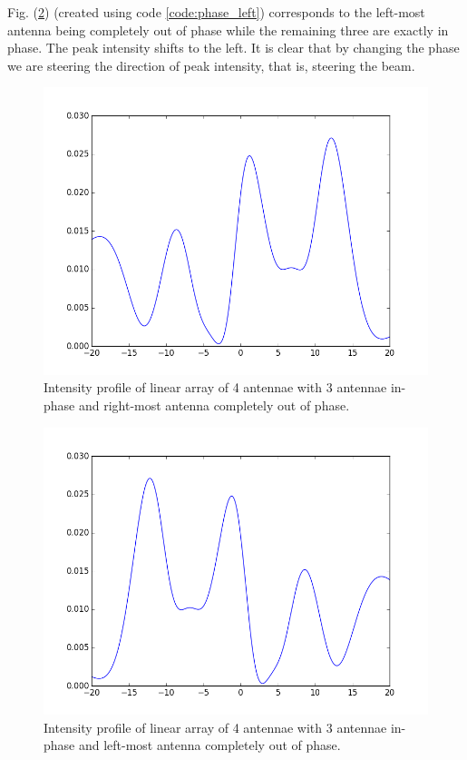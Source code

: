 Fig. (\ref{fig:phase_2}) (created using code \ref{code:phase_left}) corresponds to the left-most antenna being completely out of phase while the remaining three are exactly in phase. The peak intensity shifts to the left. It is clear that by changing the phase we are steering the direction of peak intensity, that is, steering the beam.

\begin{figure}[!h]
	\centering	
	\includegraphics[scale=0.45]{figure_3.png}
    \caption{\label{fig:phase_1} Intensity profile of linear array of 4 antennae with 3 antennae in-phase and right-most antenna completely out of phase.}
\end{figure}

\begin{figure}[!h]
	\centering	
	\includegraphics[scale=0.45]{figure_4.png}
    \caption{\label{fig:phase_2} Intensity profile of linear array of 4 antennae with 3 antennae in-phase and left-most antenna completely out of phase.}
\end{figure}

